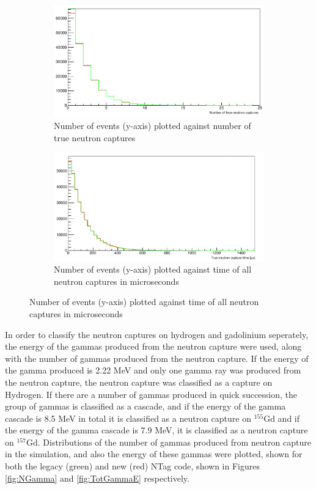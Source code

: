 \begin{figure}
    \centering
     \begin{subfigure}[b]{0.5\linewidth}
      \includegraphics[width=\linewidth]{Figures/NTrueCaptures.PNG}
      \caption{Number of events (y-axis) plotted against number of true neutron captures}
      \label{fig:NTrueCaptures} 
     \end{subfigure}
     \begin{subfigure}[b]{0.5\linewidth}
       \includegraphics[width=\linewidth]{Figures/TrueCaptureTime.PNG}
        \caption{Number of events (y-axis) plotted against time of all neutron captures in microseconds} 
     \label{fig:TrueCaptureTime}
      \end{subfigure} 
\end{figure}

In order to classify the neutron captures on hydrogen and gadolinium seperately, the energy of the gammas produced from the neutron capture were used, along with the number of gammas produced from the neutron capture. If the energy of the gamma produced is 2.22 MeV and only one gamma ray was produced from the neutron capture, the neutron capture was classified as a capture on Hydrogen. If there are a number of gammas produced in quick succession, the group of gammas is classified as a cascade, and if the energy of the gamma cascade is 8.5 MeV in total it is classified as a neutron capture on  ${ }^{155} \mathrm{Gd}$ and if the energy of the gamma cascade is 7.9 MeV, it is classified as a neutron capture on ${ }^{157} \mathrm{Gd}$. Distributions of the number of gammas produced from neutron capture in the simulation, and also the energy of these gammas were plotted, shown for both the legacy (green) and new (red) NTag code, shown in Figures \ref{fig:NGamma} and \ref{fig:TotGammaE} respectively. 

